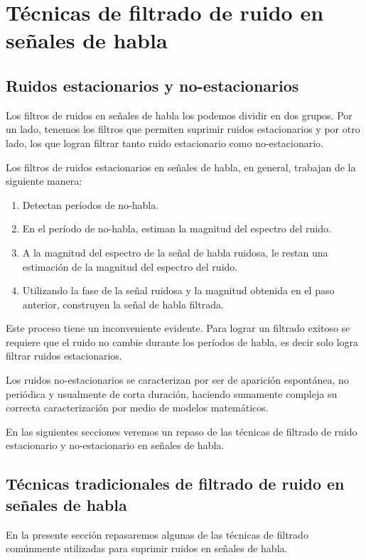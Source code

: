 \section{Técnicas de filtrado de ruido en señales de habla}

\subsection{Ruidos estacionarios y no-estacionarios}

Los filtros de ruidos en señales de habla los podemos dividir en dos grupos. Por un lado, tenemos los filtros que permiten suprimir ruidos estacionarios y por otro lado, los que logran filtrar tanto ruido estacionario como no-estacionario.

Los filtros de ruidos estacionarios en señales de habla, en general, trabajan de la siguiente manera:

\begin{enumerate}
	\item Detectan períodos de no-habla.
	\item En el período de no-habla, estiman la magnitud del espectro del ruido.
	\item A la magnitud del espectro de la señal de habla ruidosa, le restan una estimación de la magnitud del espectro del ruido.
	\item Utilizando la fase de la señal ruidosa y la magnitud obtenida en el paso anterior, construyen la señal de habla filtrada.
\end{enumerate}

Este proceso tiene un inconveniente evidente. Para lograr un filtrado exitoso se requiere que el ruido no cambie durante los períodos de habla, es decir solo logra filtrar ruidos estacionarios.

Los ruidos no-estacionarios se caracterizan por ser de aparición espontánea, no periódica y usualmente de corta duración, haciendo sumamente compleja su correcta caracterización por medio de modelos matemáticos.

En las siguientes secciones veremos un repaso de las técnicas de filtrado de ruido estacionario y no-estacionario en señales de habla.

\subsection{Técnicas tradicionales de filtrado de ruido en señales de habla}

En la presente sección repasaremos algunas de las técnicas de filtrado comúnmente utilizadas para suprimir ruidos en señales de habla.

